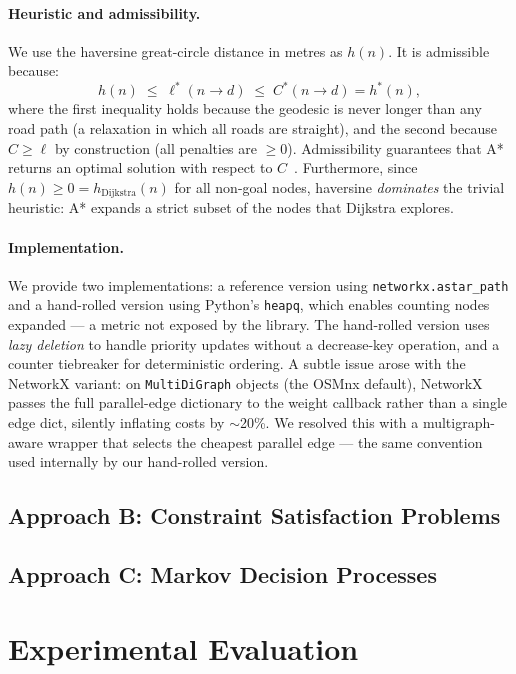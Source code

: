 \documentclass[letterpaper]{article} %
\begin{document}
\paragraph{Heuristic and admissibility.}
We use the haversine great-circle distance in metres as $h(n)$.
It is admissible because:
%
\begin{equation}
  h(n)
  \;\leq\; \ell^*(n \!\to\! d)
  \;\leq\; C^*(n \!\to\! d) = h^*(n),
  \label{eq:admissibility}
\end{equation}
%
where the first inequality holds because the geodesic
is never longer than any road path (a relaxation in which
all roads are straight), and the second because
$C \geq \ell$ by construction (all penalties are $\geq 0$).
Admissibility guarantees that A* returns an optimal solution
with respect to $C$~\cite{lecturenotes}.
Furthermore, since $h(n) \geq 0 = h_{\text{Dijkstra}}(n)$
for all non-goal nodes, haversine \emph{dominates} the
trivial heuristic: A* expands a strict subset of the
nodes that Dijkstra explores.

\paragraph{Implementation.}
We provide two implementations: a reference version using
\texttt{networkx.astar\_path} and a hand-rolled version using
Python's \texttt{heapq}, which enables counting nodes expanded
— a metric not exposed by the library.
The hand-rolled version uses \emph{lazy deletion} to handle
priority updates without a decrease-key operation, and a
counter tiebreaker for deterministic ordering.
A subtle issue arose with the NetworkX variant: on
\texttt{MultiDiGraph} objects (the OSMnx default), NetworkX
passes the full parallel-edge dictionary to the weight
callback rather than a single edge dict, silently inflating
costs by $\sim$20\%. We resolved this with a multigraph-aware
wrapper that selects the cheapest parallel edge — the same
convention used internally by our hand-rolled version.


\subsection{Approach B: Constraint Satisfaction Problems}

\subsection{Approach C: Markov Decision Processes}

\section{Experimental Evaluation}
\end{document}
